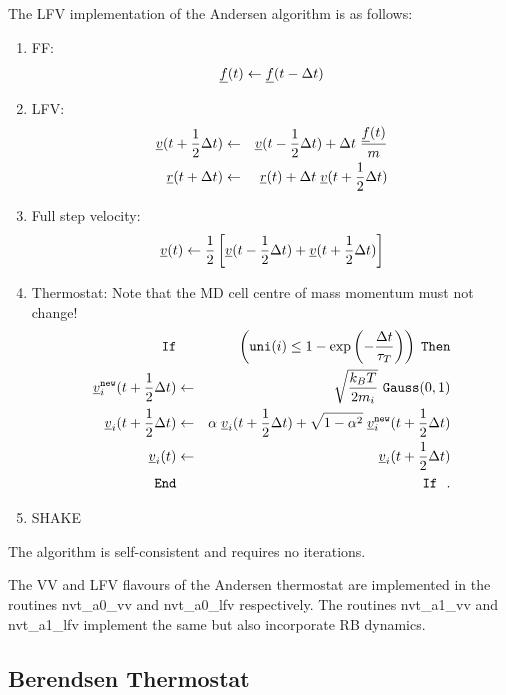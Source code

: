 The LFV implementation of the Andersen algorithm is as follows:
\begin{enumerate}
\item FF:
\begin{equation}
\mbox{$\underline{f}$}(t) \leftarrow \mbox{$\underline{f}$}(t - \Delta t)
\end{equation}
\item LFV:
\begin{eqnarray}
\mbox{$\underline{v}$}(t + {1 \over 2} \Delta t) &\leftarrow&
\mbox{$\underline{v}$}(t - {1 \over 2} \Delta t) + \Delta t \; {\mbox{$\underline{f}$}(t) \over m} \nonumber \\
\mbox{$\underline{r}$}(t + \Delta t) &\leftarrow& \mbox{$\underline{r}$}(t) + \Delta t \; \mbox{$\underline{v}$}(t + {1 \over 2} \Delta t)
\end{eqnarray}
\item Full step velocity:
\begin{equation}
\mbox{$\underline{v}$}(t) \leftarrow {1 \over 2} \left[ \mbox{$\underline{v}$}(t - {1 \over 2} \Delta t) +
\mbox{$\underline{v}$}(t + {1 \over 2} \Delta t) \right]
\end{equation}
\item Thermostat: Note that the MD cell centre of mass momentum must not change!
\begin{eqnarray}
{\tt If} && \left({\tt uni}(i) \le 1 - \exp \left(-\frac{\Delta t}{\tau_{T}}\right) \right)
\; {\tt Then} \nonumber \\
\mbox{$\underline{v}$}_{i}^{\tt new}(t + {1 \over 2} \Delta t) &\leftarrow& \sqrt{\frac{k_{B}T}{2 m_{i}}}~{\tt Gauss}(0,1) \nonumber \\
\mbox{$\underline{v}$}_{i}(t + {1 \over 2} \Delta t) &\leftarrow&
\alpha \; \mbox{$\underline{v}$}_{i}(t + {1 \over 2} \Delta t) + \sqrt{1-\alpha^{2}} \; \mbox{$\underline{v}$}_{i}^{\tt new}(t + {1 \over 2} \Delta t) \\
\mbox{$\underline{v}$}_{i}(t) &\leftarrow& \mbox{$\underline{v}$}_{i}(t + {1 \over 2} \Delta t) \nonumber \\
{\tt End} && {\tt If}~~.\nonumber
\end{eqnarray}
\item SHAKE
\end{enumerate}
The algorithm is self-consistent and requires no iterations.

The VV and LFV flavours of the Andersen thermostat are implemented in
the \D routines {\sc nvt\_a0\_vv} and {\sc nvt\_a0\_lfv} respectively.
The routines {\sc nvt\_a1\_vv} and {\sc nvt\_a1\_lfv} implement the
same but also incorporate RB dynamics.

\subsection{Berendsen Thermostat}

